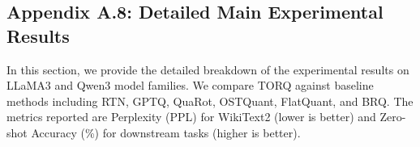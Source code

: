 \subsection*{Appendix A.8: Detailed Main Experimental Results}
\label{app:main_experiments}

In this section, we provide the detailed breakdown of the experimental results on LLaMA3 and Qwen3 model families. We compare TORQ against baseline methods including RTN, GPTQ, QuaRot, OSTQuant, FlatQuant, and BRQ. The metrics reported are Perplexity (PPL) for WikiText2 (lower is better) and Zero-shot Accuracy (\%) for downstream tasks (higher is better).










